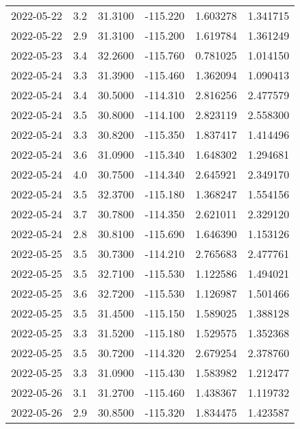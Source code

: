 \begin{tabular}{lrrrrr}
2022-05-22 &       3.2 &  31.3100 &  -115.220 &         1.603278 &         1.341715 \\
2022-05-22 &       2.9 &  31.3100 &  -115.200 &         1.619784 &         1.361249 \\
2022-05-23 &       3.4 &  32.2600 &  -115.760 &         0.781025 &         1.014150 \\
2022-05-24 &       3.3 &  31.3900 &  -115.460 &         1.362094 &         1.090413 \\
2022-05-24 &       3.4 &  30.5000 &  -114.310 &         2.816256 &         2.477579 \\
2022-05-24 &       3.5 &  30.8000 &  -114.100 &         2.823119 &         2.558300 \\
2022-05-24 &       3.3 &  30.8200 &  -115.350 &         1.837417 &         1.414496 \\
2022-05-24 &       3.6 &  31.0900 &  -115.340 &         1.648302 &         1.294681 \\
2022-05-24 &       4.0 &  30.7500 &  -114.340 &         2.645921 &         2.349170 \\
2022-05-24 &       3.5 &  32.3700 &  -115.180 &         1.368247 &         1.554156 \\
2022-05-24 &       3.7 &  30.7800 &  -114.350 &         2.621011 &         2.329120 \\
2022-05-24 &       2.8 &  30.8100 &  -115.690 &         1.646390 &         1.153126 \\
2022-05-25 &       3.5 &  30.7300 &  -114.210 &         2.765683 &         2.477761 \\
2022-05-25 &       3.5 &  32.7100 &  -115.530 &         1.122586 &         1.494021 \\
2022-05-25 &       3.6 &  32.7200 &  -115.530 &         1.126987 &         1.501466 \\
2022-05-25 &       3.5 &  31.4500 &  -115.150 &         1.589025 &         1.388128 \\
2022-05-25 &       3.3 &  31.5200 &  -115.180 &         1.529575 &         1.352368 \\
2022-05-25 &       3.5 &  30.7200 &  -114.320 &         2.679254 &         2.378760 \\
2022-05-25 &       3.3 &  31.0900 &  -115.430 &         1.583982 &         1.212477 \\
2022-05-26 &       3.1 &  31.2700 &  -115.460 &         1.438367 &         1.119732 \\
2022-05-26 &       2.9 &  30.8500 &  -115.320 &         1.834475 &         1.423587 \\

\end{tabular}
